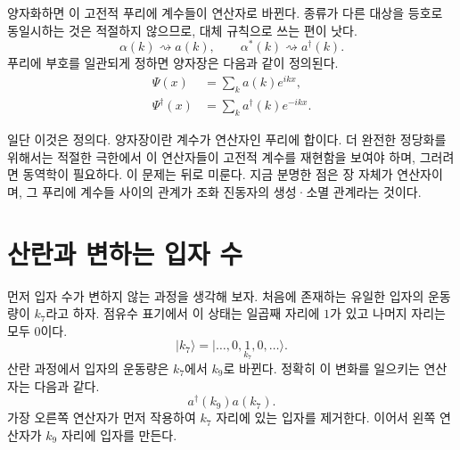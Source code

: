 양자화하면 이 고전적 푸리에 계수들이 연산자로 바뀐다. 종류가 다른 대상을 등호로 동일시하는 것은 적절하지 않으므로, 대체 규칙으로 쓰는 편이 낫다.
\begin{equation}
\alpha(k)\rightsquigarrow a(k),
\qquad
\alpha^*(k)\rightsquigarrow a^\dagger(k).
\end{equation}
푸리에 부호를 일관되게 정하면 양자장은 다음과 같이 정의된다.
\begin{align}
\Psi(x)&=\sum_k a(k)e^{ikx},\\
\Psi^\dagger(x)&=\sum_k a^\dagger(k)e^{-ikx}.
\end{align}

일단 이것은 정의다. 양자장이란 계수가 연산자인 푸리에 합이다. 더 완전한 정당화를 위해서는 적절한 극한에서 이 연산자들이 고전적 계수를 재현함을 보여야 하며, 그러려면 동역학이 필요하다. 이 문제는 뒤로 미룬다. 지금 분명한 점은 장 자체가 연산자이며, 그 푸리에 계수들 사이의 관계가 조화 진동자의 생성·소멸 관계라는 것이다.

\begin{classroomqa}\end{classroomqa}

\section{산란과 변하는 입자 수}

먼저 입자 수가 변하지 않는 과정을 생각해 보자. 처음에 존재하는 유일한 입자의 운동량이 \(k_7\)라고 하자. 점유수 표기에서 이 상태는 일곱째 자리에 \(1\)가 있고 나머지 자리는 모두 0이다.
\begin{equation}
|k_7\rangle
=
|\ldots,0,\underset{k_7}{1},0,\ldots\rangle.
\end{equation}
산란 과정에서 입자의 운동량은 \(k_7\)에서 \(k_9\)로 바뀐다. 정확히 이 변화를 일으키는 연산자는 다음과 같다.
\begin{equation}
a^\dagger(k_9)a(k_7).
\end{equation}
가장 오른쪽 연산자가 먼저 작용하여 \(k_7\) 자리에 있는 입자를 제거한다. 이어서 왼쪽 연산자가 \(k_9\) 자리에 입자를 만든다.

